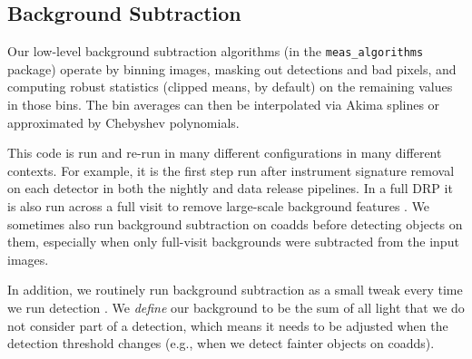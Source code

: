 \subsection{Background Subtraction}
\label{sec:backgrounds}

Our low-level background subtraction algorithms (in the \texttt{meas\_algorithms} package) operate by binning images, masking out detections and bad pixels, and computing robust statistics (clipped means, by default) on the remaining values in those bins.
The bin averages can then be interpolated via Akima splines or approximated by Chebyshev polynomials.

This code is run and re-run in many different configurations in many different contexts.
For example, it is the first step run after instrument signature removal  on each detector in both the nightly and data release pipelines.
In a full DRP it is also run across a full visit to remove large-scale background features \citep{2019PASJ...71..114A}.
We sometimes also run background subtraction on coadds before detecting objects on them, especially when only full-visit backgrounds were subtracted from the input images.

In addition, we routinely run background subtraction as a small tweak every time we run detection .
We \emph{define} our background to be the sum of all light that we do not consider part of a detection, which means it needs to be adjusted when the detection threshold changes (e.g., when we detect fainter objects on coadds).
